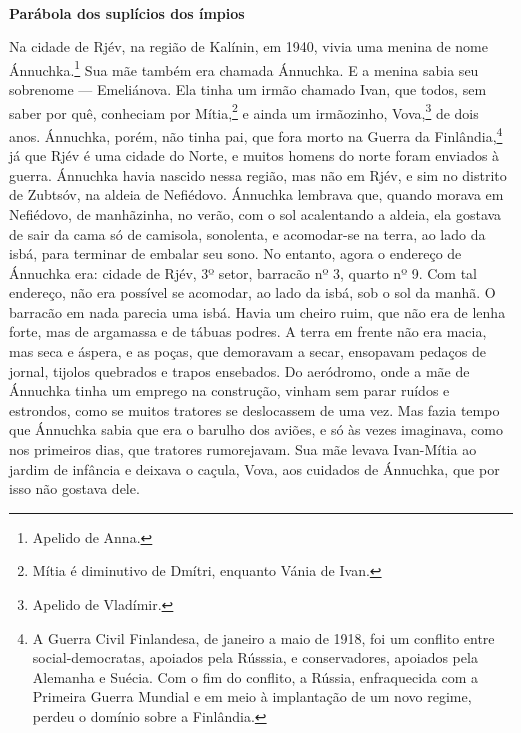 \textbf{\\
Parábola dos suplícios dos ímpios}

Na cidade de Rjév, na região de Kalínin, em 1940, vivia uma menina de
nome Ánnuchka.\footnote{Apelido de Anna.} Sua mãe também era chamada
Ánnuchka. E a menina sabia seu sobrenome --- Emeliánova. Ela tinha um
irmão chamado Ivan, que todos, sem saber por quê, conheciam por
Mítia,\footnote{Mítia é diminutivo de Dmítri, enquanto Vánia de Ivan.} e
ainda um irmãozinho, Vova,\footnote{Apelido de Vladímir.} de dois anos.
Ánnuchka, porém, não tinha pai, que fora morto na Guerra da
Finlândia,\footnote{A Guerra Civil Finlandesa, de janeiro a maio de
  1918, foi um conflito entre social-democratas, apoiados pela Rússsia,
  e conservadores, apoiados pela Alemanha e Suécia. Com o fim do
  conflito, a Rússia, enfraquecida com a Primeira Guerra Mundial e em
  meio à implantação de um novo regime, perdeu o domínio sobre a
  Finlândia.} já que Rjév é uma cidade do Norte, e muitos homens do
norte foram enviados à guerra. Ánnuchka havia nascido nessa região, mas
não em Rjév, e sim no distrito de Zubtsóv, na aldeia de Nefiédovo.
Ánnuchka lembrava que, quando morava em Nefiédovo, de manhãzinha, no
verão, com o sol acalentando a aldeia, ela gostava de sair da cama só de
camisola, sonolenta, e acomodar-se na terra, ao lado da isbá, para
terminar de embalar seu sono. No entanto, agora o endereço de Ánnuchka
era: cidade de Rjév, 3º setor, barracão nº 3, quarto nº 9. Com tal
endereço, não era possível se acomodar, ao lado da isbá, sob o sol da
manhã. O barracão em nada parecia uma isbá. Havia um cheiro ruim, que
não era de lenha forte, mas de argamassa e de tábuas podres. A terra em
frente não era macia, mas seca e áspera, e as poças, que demoravam a
secar, ensopavam pedaços de jornal, tijolos quebrados e trapos
ensebados. Do aeródromo, onde a mãe de Ánnuchka tinha um emprego na
construção, vinham sem parar ruídos e estrondos, como se muitos tratores
se deslocassem de uma vez. Mas fazia tempo que Ánnuchka sabia que era o
barulho dos aviões, e só às vezes imaginava, como nos primeiros dias,
que tratores rumorejavam. Sua mãe levava Ivan-Mítia ao jardim de
infância e deixava o caçula, Vova, aos cuidados de Ánnuchka, que por
isso não gostava dele.


